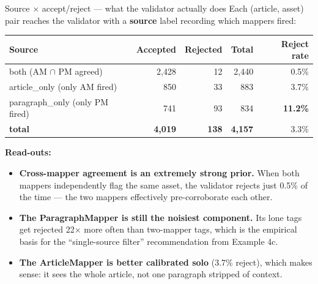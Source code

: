 \documentclass[10pt,aspectratio=169]{beamer}
\begin{document}
\begin{frame}{Source $\times$ accept/reject --- what the validator actually does}
  \scriptsize
  Each (article, asset) pair reaches the validator with a \textbf{source} label recording which
  mappers fired:

  \vspace{0.5em}
  \centering
  \setlength{\tabcolsep}{8pt}
  \renewcommand{\arraystretch}{1.2}
  \begin{tabular}{lrrrr}
    \toprule
    \textbf{Source}       & \textbf{Accepted} & \textbf{Rejected} & \textbf{Total} & \textbf{Reject rate} \\
    \midrule
    both (AM $\cap$ PM agreed)     & 2{,}428 &  12 & 2{,}440 &  0.5\% \\
    article\_only (only AM fired)  &    850 &  33 &    883 &  3.7\% \\
    paragraph\_only (only PM fired)&    741 &  93 &    834 & \textbf{11.2\%} \\
    \midrule
    \textbf{total}                 & \textbf{4{,}019} & \textbf{138} & \textbf{4{,}157} & 3.3\% \\
    \bottomrule
  \end{tabular}

  \vspace{0.6em}
  \raggedright
  \textbf{Read-outs:}
  \begin{itemize}\itemsep0.15em
    \item \textbf{Cross-mapper agreement is an extremely strong prior.} When both mappers
          independently flag the same asset, the validator rejects just 0.5\% of the time
          --- the two mappers effectively pre-corroborate each other.
    \item \textbf{The ParagraphMapper is still the noisiest component.} Its lone tags get
          rejected 22$\times$ more often than two-mapper tags, which is the empirical basis
          for the ``single-source filter'' recommendation from Example 4c.
    \item \textbf{The ArticleMapper is better calibrated solo} (3.7\% reject), which makes
          sense: it sees the whole article, not one paragraph stripped of context.
  \end{itemize}
\end{frame}
\end{document}
